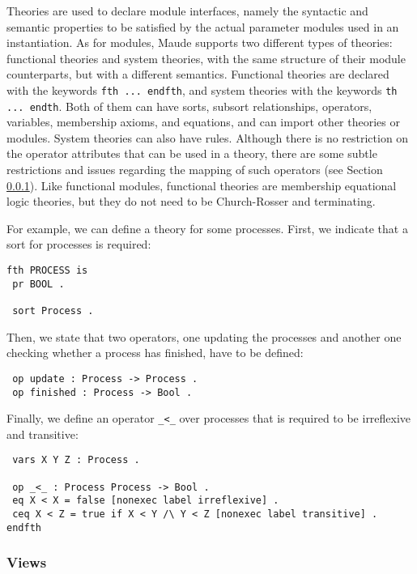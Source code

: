 Theories are used to declare module interfaces, namely the syntactic
and semantic properties to be satisfied by the actual parameter modules
used in an instantiation. As for modules, Maude supports two different types
of theories: functional theories and system theories, with the same structure
of their module counterparts, but with a different semantics. Functional
theories  are declared with the keywords \verb"fth ... endfth", and
system theories with the keywords \verb"th ... endth". Both of them can
have sorts, subsort relationships, operators, variables, membership axioms,
and equations, and can import other theories or modules. System theories can
also have rules. Although there is no restriction on the operator attributes
that can be used in a theory, there are some subtle restrictions and
issues regarding the mapping of such operators (see Section
\ref{subsec:views}).
%
Like functional modules, functional theories are membership equational
logic theories, but they do not need to be Church-Rosser and terminating.

For example, we can define a theory for some processes. First, we indicate
that a sort for processes is required:

{\codesize
\begin{verbatim}
fth PROCESS is
 pr BOOL .

 sort Process .
\end{verbatim}
}

Then, we state that two operators, one updating the processes and another
one checking whether a process has finished, have to be defined:
 
{\codesize
\begin{verbatim}
 op update : Process -> Process .
 op finished : Process -> Bool .
\end{verbatim}
}

Finally, we define an operator \verb"_<_" over processes that is required
to be irreflexive and transitive:

{\codesize
\begin{verbatim}
 vars X Y Z : Process .
 
 op _<_ : Process Process -> Bool .
 eq X < X = false [nonexec label irreflexive] .
 ceq X < Z = true if X < Y /\ Y < Z [nonexec label transitive] .
endfth
\end{verbatim}
}

\subsubsection{Views}\label{subsec:views}

